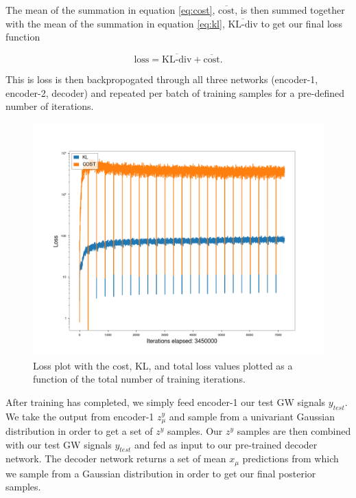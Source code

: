 \documentclass[%
showpacs,
 amsmath,amssymb,
 aps,
 twocolumn,
 prl,
 reprint,
floatfix,
]{revtex4-1}
\begin{document}
The mean of the summation in equation \ref{eq:cost}, $\overline{\textrm{cost}}$, 
is then summed together with the mean of the summation in equation \ref{eq:kl}, 
$\overline{\textrm{KL-div}}$ to 
get our final loss function

\begin{equation}
    \textrm{loss} = \overline{\textrm{KL-div}} + \overline{\textrm{cost}}.
\end{equation}

This is loss is then backpropogated through all three networks 
(encoder-1, encoder-2, decoder) and repeated per batch of 
training samples for a pre-defined number of iterations.

%
%
\begin{figure}
    \includegraphics[width=\columnwidth]{images/losses_logscale.png}
    \caption{\label{fig:loss_log} Loss plot with the cost, KL, 
    and total loss values plotted as a function of the total 
    number of training iterations. }
\end{figure}

%
%
After training has completed, we simply feed encoder-1 our test 
GW signals $y_{test}$. We take the output from encoder-1 $z^{y}_{\mu}$ 
and sample from a univariant Gaussian distribution in order to get 
a set of $z^{y}$ samples. Our $z^{y}$ samples are then combined with our 
test GW signals $y_{test}$ and fed as input to our pre-trained decoder 
network. The decoder network returns a set of mean $x_{\mu}$ predictions 
from which we sample from a Gaussian distribution in order to get 
our final posterior samples.
\end{document}
